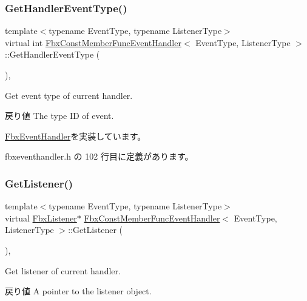 \subsubsection{\texorpdfstring{Get\+Handler\+Event\+Type()}{GetHandlerEventType()}}
{\footnotesize\ttfamily template$<$typename Event\+Type, typename Listener\+Type$>$ \\
virtual int \hyperlink{class_fbx_const_member_func_event_handler}{Fbx\+Const\+Member\+Func\+Event\+Handler}$<$ Event\+Type, Listener\+Type $>$\+::Get\+Handler\+Event\+Type (\begin{DoxyParamCaption}{ }\end{DoxyParamCaption})\hspace{0.3cm}{\ttfamily [inline]}, {\ttfamily [virtual]}}

Get event type of current handler. \begin{DoxyReturn}{戻り値}
The type ID of event. 
\end{DoxyReturn}


\hyperlink{class_fbx_event_handler_a0b42d2b93e63d866975f468a481c9f3c}{Fbx\+Event\+Handler}を実装しています。



 fbxeventhandler.\+h の 102 行目に定義があります。

\mbox{\label{class_fbx_const_member_func_event_handler_a9e370edd4a746ef5098d39a4f9c3d63c}} 
\subsubsection{\texorpdfstring{Get\+Listener()}{GetListener()}}
{\footnotesize\ttfamily template$<$typename Event\+Type, typename Listener\+Type$>$ \\
virtual \hyperlink{class_fbx_listener}{Fbx\+Listener}$\ast$ \hyperlink{class_fbx_const_member_func_event_handler}{Fbx\+Const\+Member\+Func\+Event\+Handler}$<$ Event\+Type, Listener\+Type $>$\+::Get\+Listener (\begin{DoxyParamCaption}{ }\end{DoxyParamCaption})\hspace{0.3cm}{\ttfamily [inline]}, {\ttfamily [virtual]}}

Get listener of current handler. \begin{DoxyReturn}{戻り値}
A pointer to the listener object. 
\end{DoxyReturn}


